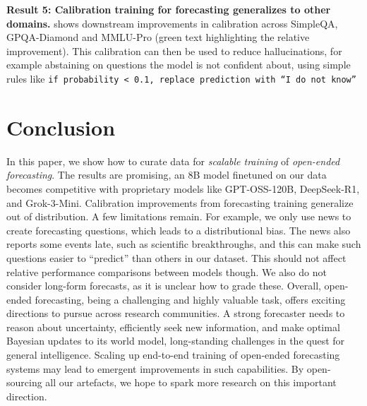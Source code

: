 \documentclass{article} %
\newcommand{\ourdataset}{\texttt{OpenForesight}}
\newcommand{\contribution}[1]{\textcolor{myblue}{\textbf{#1}}}
\begin{document}

\contribution{Result 5: Calibration training for forecasting generalizes to other domains.}  shows downstream improvements in calibration across SimpleQA, GPQA-Diamond and MMLU-Pro (green text highlighting the relative improvement).
This calibration can then be used to reduce hallucinations, for example abstaining on questions the model is not confident about, using simple rules like \texttt{if probability < 0.1, replace prediction with ``I do not know''}\vspace{0.15cm}



\section{Conclusion}
\label{sec:conclusion}

 In this paper, we show how to curate data for \textit{scalable training} of \textit{open-ended forecasting}. The results are promising, an 8B model finetuned on our data becomes competitive with proprietary models like GPT-OSS-120B, DeepSeek-R1, and Grok-3-Mini. Calibration improvements from forecasting training generalize out of distribution. A few limitations remain. For example, we only use news to create forecasting questions, which leads to a distributional bias. The news also reports some events late, such as scientific breakthroughs, and this can make such questions easier to ``predict'' than others in our dataset. This should not affect relative performance comparisons between models though. We also do not consider long-form forecasts, as it is unclear how to grade these. Overall, open-ended forecasting, being a challenging and highly valuable task, offers exciting directions to pursue across research communities. A strong forecaster needs to reason about uncertainty, efficiently seek new information, and make optimal Bayesian updates to its world model, long-standing challenges in the quest for general intelligence. Scaling up end-to-end training of open-ended forecasting systems may lead to emergent improvements in such capabilities. By open-sourcing all our artefacts, we hope to spark more research on this important direction.
\end{document}
